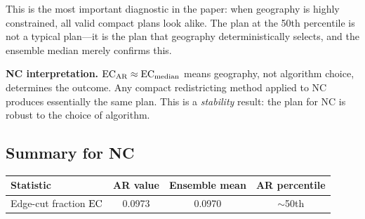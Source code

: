 This is the most important diagnostic in the paper: when geography is highly
constrained, all valid compact plans look alike.  The \ar{} plan at the 50th
percentile is not a typical plan---it is the plan that geography
deterministically selects, and the ensemble median merely confirms this.

\begin{keybox}
\textbf{NC interpretation.} $\mathrm{EC}_{\mathrm{AR}} \approx \mathrm{EC}_{\mathrm{median}}$
means geography, not algorithm choice, determines the outcome.  Any compact
redistricting method applied to NC produces essentially the same plan.
This is a \emph{stability} result: the \ar{} plan for NC is robust to the
choice of algorithm.
\end{keybox}

\subsection{Summary for NC}

\begin{center}
\begin{tabular}{lccc}
\toprule
Statistic & AR value & Ensemble mean & AR percentile \\
\midrule
Edge-cut fraction $\mathrm{EC}$ & 0.0973 & 0.0970 & $\sim$50th \\
\bottomrule
\end{tabular}
\end{center}
